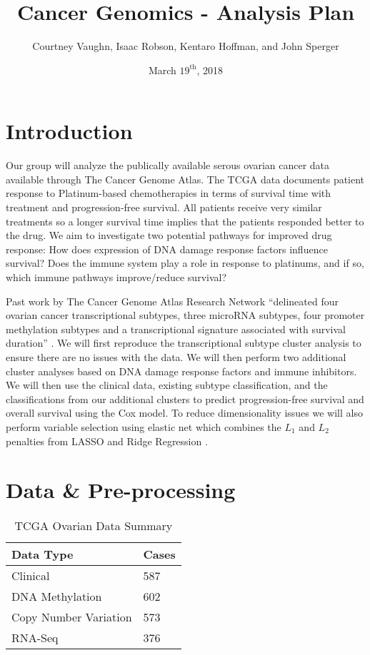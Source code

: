 \documentclass{article}
\author{
Courtney Vaughn, Isaac Robson, Kentaro Hoffman, and John Sperger
}
\title{Cancer Genomics - Analysis Plan}
\date{March $19^{\mathrm{th}}$, 2018}
\begin{document}
\maketitle

\section{Introduction}

   Our group will analyze the publically available serous ovarian cancer data available through The Cancer Genome Atlas. The TCGA data documents patient response to Platinum-based chemotherapies in terms of survival time with treatment and progression-free survival. All patients receive very similar treatments so a longer survival time implies that the patients responded better to the drug. We aim to investigate two potential pathways for improved drug response: How does expression of DNA damage response factors influence survival? Does the immune system play a role in response to platinums, and if so, which immune pathways improve/reduce survival? 
  
   Past work by The Cancer Genome Atlas Research Network ``delineated four ovarian cancer transcriptional subtypes, three microRNA subtypes, four promoter methylation subtypes and a transcriptional signature associated with survival duration'' \cite{cancer2011integrated}. We will first reproduce the transcriptional subtype cluster analysis to ensure there are no issues with the data. We will then perform two additional cluster analyses based on DNA damage response factors and immune inhibitors. We will then use the clinical data, existing subtype classification, and the classifications from our additional clusters to predict progression-free survival and overall survival using the Cox model. To reduce dimensionality issues we will also perform variable selection using elastic net which combines the $L_1$ and $L_2$ penalties from LASSO and Ridge Regression \cite{zou2005regularization}.  

\section{Data \& Pre-processing}

\begin{table}[h!] \centering
  \begin{tabular}{ll} \toprule
  Data Type & Cases \\
  \hline
  Clinical & 587 \\
  DNA Methylation & 602 \\
  Copy Number Variation & 573 \\
  RNA-Seq & 376 \\
  \bottomrule
  \end{tabular}
\caption{TCGA Ovarian Data Summary}
\end{table}
\end{document}
